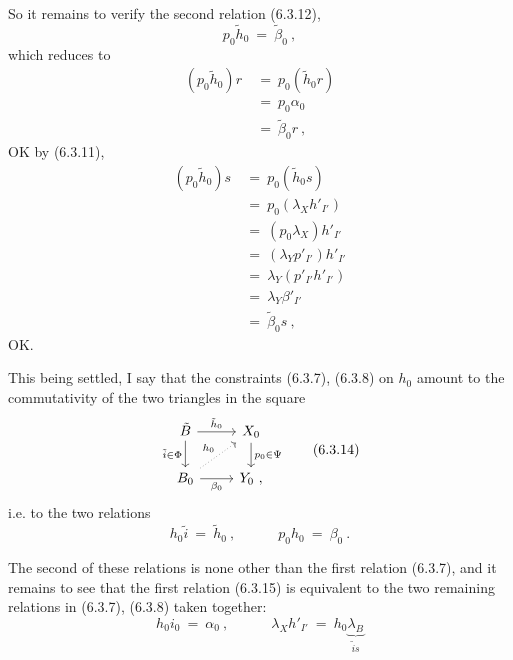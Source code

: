 \documentclass[11pt]{article}
\newcommand{\msp}[1]{\marginpar{\footnotesize [#1]}}
\begin{document}
So it remains to verify the second relation (6.3.12),
\[
p_0\tilde{h}_0 \ =\ \tilde{\beta}_0\ ,
\]
which reduces to
\[
\begin{aligned}
(p_0\tilde{h}_0)r \ &=\ p_0(\tilde{h}_0r) \\
&=\ p_0\alpha_0 \\
&=\ \tilde{\beta}_0r\ ,
\end{aligned}
\]
OK by (6.3.11),
\[
\begin{aligned}
(p_0\tilde{h}_0)s \ &=\ p_0(\tilde{h}_0s) \\
&=\ p_0(\lambda_X h'_{I'}) \\
&=\ (p_0\lambda_X)h'_{I'} \\
&=\ (\lambda_Y p'_{I'})h'_{I'} \\
&=\ \lambda_Y(p'_{I'}h'_{I'}) \\
&=\ \lambda_Y\beta'_{I'} \\
&=\ \tilde{\beta}_0s\ ,
\end{aligned}
\]
OK.

This being settled, I say that the constraints (6.3.7), (6.3.8) on $h_0$ amount to the commutativity of the two triangles in the square %
\[
\begin{tikzcd}
\tilde{B} \arrow[r, "\tilde{h}_0"] \arrow[d, "\tilde{i}\in\Phi"'] & X_0 \arrow[d, "p_0\in\Psi"] \\
B_0 \arrow[r, "\beta_0"'] \arrow[ur, dotted, "h_0"] & Y_0\ ,
\end{tikzcd}
\tag*{(6.3.14)}
\]
\msp{page 116}i.e. to the two relations
\[
h_0\tilde{i} \ =\ \tilde{h}_0\ , \qquad\quad p_0h_0 \ =\ \beta_0\ .
\tag*{(6.3.15)}
\]

The second of these relations is none other than the first relation (6.3.7), and it remains to see that the first relation (6.3.15) is equivalent to the two remaining relations in (6.3.7), (6.3.8) taken together:
\[
h_0i_0 \ =\ \alpha_0\ , \qquad\quad \lambda_X h'_{I'} \ =\ h_0\underbrace{\lambda_B}_{\tilde{i}s}
\tag*{(6.3.16)}
\]
\end{document}
